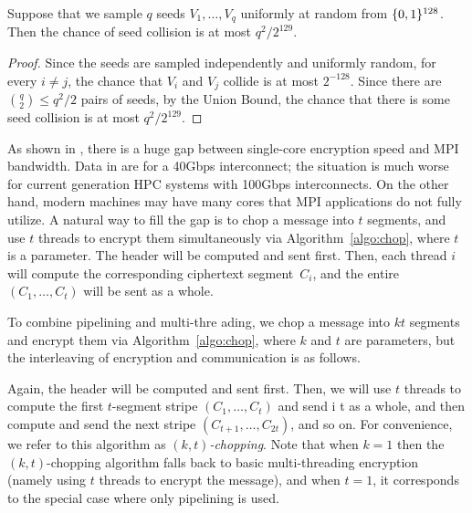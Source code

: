 \begin{proposition}
Suppose that we sample $q$ seeds $V_1, \ldots, V_q$ uniformly at random from $\{0,1\}^{128}$.
Then the chance of seed collision is at most $q^2 / 2^{129}$.
\end{proposition}
\begin{proof}
Since the seeds are sampled independently and uniformly random,
for every $i \ne j$, the chance that $V_i$ and $V_j$ collide is at most $2^{-128}$.
Since there are ${q \choose 2} \leq q^2 /2$ pairs of seeds,
by the Union Bound, the chance that there is some seed collision is at most $q^2 / 2^{129}$.
\end{proof}

 As shown
in ,
there is a huge gap between single-core encryption speed and %
MPI bandwidth.
Data in  are for a 40Gbps interconnect;
the situation is much worse for current generation HPC systems with 100Gbps interconnects.
On the other hand, modern machines may have many cores that MPI applications
do not fully utilize. A natural way to fill the gap is to
chop a message into $t$ segments,
and use $t$ threads to encrypt them simultaneously via Algorithm~\ref{algo:chop},
where $t$ is a parameter.
The header will be computed and sent first.
Then, each thread $i$ will compute the corresponding ciphertext segment~$C_i$,
and the entire $(C_1, \ldots, C_t)$ will be sent as a whole.

  To combine pipelining and multi-thre
ading,
we chop a message into $kt$ segments and encrypt them via Algorithm~\ref{algo:chop},
where $k$ and $t$ are parameters,
but the interleaving of encryption and communication is as follows.

Again, the header will be computed and sent first.
Then, we will use $t$ threads to compute the first $t$-segment stripe $(C_1, \ldots, C_t)$ and send i
t as a whole,
and then compute  and send the next stripe $(C_{t + 1}, \ldots, C_{2t})$, and so on.
For convenience, we refer to this algorithm as \emph{$(k, t)$-chopping}.
Note that when $k = 1$ then the
$(k, t)$-chopping algorithm falls back to basic multi-threading encryption (namely using
$t$ threads to encrypt the message),
and when $t = 1$, it corresponds to the special case where only pipelining is used.


